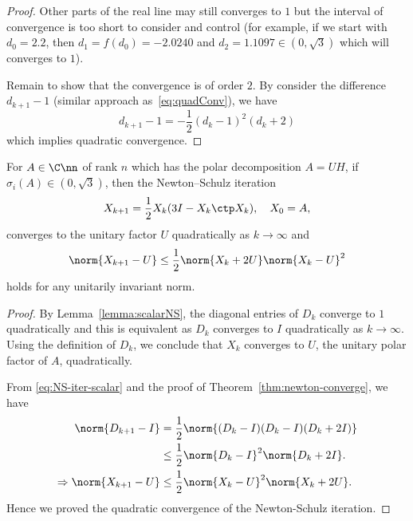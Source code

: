 \documentclass{article}
\numberwithin{equation}{section} %
\newcommand{\gnorm}[1]{\norm{#1}}
\begin{document}
\begin{proof}
    Other parts of the real line may still converges to $1$ but the
    interval of convergence is too short to consider and control (for
    example, if we start with $d_0 = 2.2$, then $d_1 = f(d_0) = -2.0240$
    and $d_2 = 1.1097 \in (0,\sqrt{3})$ which will converges to $1$).

    Remain to show that the convergence is of order $2$. By consider the
    difference $d_{k+1} - 1$ (similar approach as~\eqref{eq:quadConv}), we
    have
    \begin{equation}\label{eq:NS-iter-scalar}
      d_{k+1} - 1 = -\frac 12 (d_k-1)^2 (d_k + 2)
    \end{equation}
    which implies quadratic convergence.
    \end{proof}

    \begin{theorem} 
    \label{thm:newtonSchulzConverge}
    For $A\in\C\nn$ of rank $n$ which has the polar decomposition $A = UH$,
    if $\sigma_i(A) \in (0,\sqrt{3})$, then the Newton--Schulz iteration
    \begin{equation}\notag
      X_{k+1} = \frac 12 X_k(3I-X_k\ctp X_k),\quad X_0 = A,
    \end{equation}
    converges to the unitary factor $U$ quadratically as $k\to\infty$ and
    \begin{equation}\label{eq:NSconv}
      \gnorm{X_{k+1} - U} \leq \frac 12 \gnorm{X_k + 2U} \gnorm{X_k - U}^2
    \end{equation}
    holds for any unitarily invariant norm.
    \end{theorem}

\begin{proof}
By Lemma~\ref{lemma:scalarNS}, the diagonal entries of $D_k$ converge to
$1$ quadratically and this is equivalent as $D_k$ converges to $I$
quadratically as $k\to\infty$. Using the definition of $D_k$, we conclude
that $X_k$ converges to $U$, the unitary polar factor of $A$,
quadratically.

From \eqref{eq:NS-iter-scalar} and the proof of
Theorem~\ref{thm:newton-converge}, we have
\begin{equation}
  \notag 
  \begin{aligned}
    \gnorm{D_{k+1} - I} &= \frac{1}{2}\gnorm{(D_k - I)(D_k - I)(D_k + 2I)} \\
                        & \leq \frac{1}{2}\gnorm{D_k - I}^2 \gnorm{D_k + 2I}.\\
    \Rightarrow 
    \gnorm{X_{k+1} - U} &\leq \frac{1}{2} \gnorm{X_k - U}^2 \gnorm{X_k + 2U}.
  \end{aligned}
\end{equation}
Hence we proved the quadratic convergence of the Newton-Schulz iteration.
\end{proof}
\end{document}
